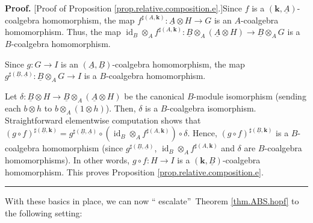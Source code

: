 \documentclass
[numbers=enddot,12pt,final,onecolumn,notitlepage,abstracton]{scrartcl}%
\theoremstyle{definition}
\newenvironment{proof}[1][Proof]{\noindent\textbf{#1.} }{\ \rule{0.5em}{0.5em}}
\begin{document}
\begin{proof}
[Proof of Proposition \ref{prop.relative.composition.e}.]Since $f$ is a
$\left(  \mathbf{k},\underline{A}\right)  $-coalgebra homomorphism, the map
$f^{\sharp\left(  A,\mathbf{k}\right)  }:\underline{A}\otimes H\rightarrow G$
is an $A$-coalgebra homomorphism. Thus, the map $\operatorname*{id}%
\nolimits_{B}\otimes_{A}f^{\sharp\left(  A,\mathbf{k}\right)  }:\underline{B}%
\otimes_{A}\left(  \underline{A}\otimes H\right)  \rightarrow\underline{B}%
\otimes_{A}G$ is a $B$-coalgebra homomorphism.

Since $g:G\rightarrow I$ is an $\left(  \underline{A},\underline{B}\right)
$-coalgebra homomorphism, the map $g^{\sharp\left(  \underline{B}%
,\underline{A}\right)  }:\underline{B}\otimes_{A}G\rightarrow I$ is a
$B$-coalgebra homomorphism.

Let $\delta:\underline{B}\otimes H\rightarrow\underline{B}\otimes_{A}\left(
\underline{A}\otimes H\right)  $ be the canonical $B$-module isomorphism
(sending each $b\otimes h$ to $b\otimes_{A}\left(  1\otimes h\right)  $).
Then, $\delta$ is a $B$-coalgebra isomorphism. Straightforward elementwise
computation shows that $\left(  g\circ f\right)  ^{\sharp\left(
\underline{B},\mathbf{k}\right)  }=g^{\sharp\left(  \underline{B}%
,\underline{A}\right)  }\circ\left(  \operatorname*{id}\nolimits_{B}%
\otimes_{A}f^{\sharp\left(  A,\mathbf{k}\right)  }\right)  \circ\delta$.
Hence, $\left(  g\circ f\right)  ^{\sharp\left(  \underline{B},\mathbf{k}%
\right)  }$ is a $B$-coalgebra homomorphism (since $g^{\sharp\left(
\underline{B},\underline{A}\right)  }$, $\operatorname*{id}\nolimits_{B}%
\otimes_{A}f^{\sharp\left(  A,\mathbf{k}\right)  }$ and $\delta$ are
$B$-coalgebra homomorphisms). In other words, $g\circ f:H\rightarrow I$ is a
$\left(  \mathbf{k},\underline{B}\right)  $-coalgebra homomorphism. This
proves Proposition \ref{prop.relative.composition.e}.
\end{proof}

With these basics in place, we can now \textquotedblleft
escalate\textquotedblright\ Theorem \ref{thm.ABS.hopf} to the following setting:
\end{document}
